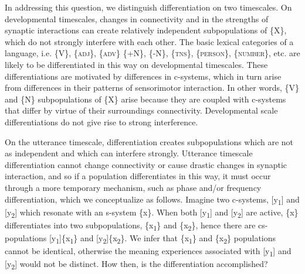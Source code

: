   In addressing this question, we distinguish differentiation on two timescales. On developmental timescales, changes in connectivity and in the strengths of synaptic interactions can create relatively independent subpopulations of \{X\}, which do not strongly interfere with each other. The basic lexical categories of a language, i.e. \{V\}, \{\textsc{adj}\}, \{\textsc{adv}\} \{+N\}, \{-N\}, \{\textsc{tns}\}, \{\textsc{person}\}, \{\textsc{number}\}, etc. are likely to be differentiated in this way on developmental timescales. These differentiations are motivated by differences in c-systems, which in turn arise from differences in their patterns of sensorimotor interaction. In other words, \{V\} and \{N\} subpopulations of \{X\} arise because they are coupled with c-systems that differ by virtue of their surroundings connectivity. Developmental scale differentiations do not give rise to strong interference.

  On the utterance timescale, differentiation creates subpopulations which are not as independent and which can interfere strongly. Utterance timescale differentiation cannot change connectivity or cause drastic changes in synaptic interaction, and so if a population differentiates in this way, it must occur through a more temporary mechanism, such as phase and/or frequency differentiation, which we conceptualize as follows. Imagine two c-systems, [y\textsubscript{1}] and [y\textsubscript{2}] which resonate with an s-system \{x\}. When both [y\textsubscript{1}] and [y\textsubscript{2}] are active, \{x\} differentiates into two subpopulations, \{x\textsubscript{1}\} and \{x\textsubscript{2}\}, hence there are cs-populations [y\textsubscript{1}]\{x\textsubscript{1}\} and [y\textsubscript{2}]\{x\textsubscript{2}\}. We infer that \{x\textsubscript{1}\} and \{x\textsubscript{2}\} populations cannot be identical, otherwise the meaning experiences associated with [y\textsubscript{1}] and [y\textsubscript{2}] would not be distinct. How then, is the differentiation accomplished? 

